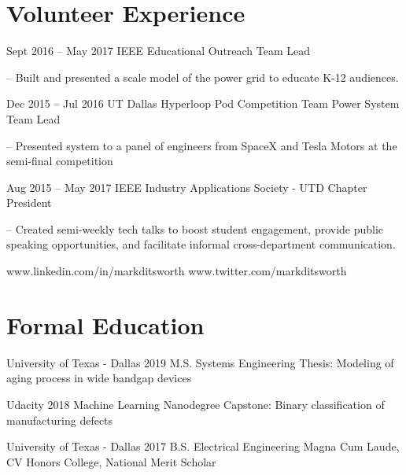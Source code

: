 \documentclass{tccv}
\begin{document}
\section{Volunteer Experience}

\begin{eventlist}
	\item{Sept 2016 -- May 2017}
	{IEEE Educational Outreach}
	{Team Lead}
	
-- Built and presented a scale model of the power grid to educate K-12 audiences. 
	
	\item{Dec 2015 -- Jul 2016}
	{UT Dallas Hyperloop Pod Competition Team}
	{Power System Team Lead}

-- Presented system to a panel of engineers from SpaceX and Tesla Motors at the semi-final competition

	\item{Aug 2015 -- May 2017}
	{IEEE Industry Applications Society - UTD Chapter}
	{President}

-- Created semi-weekly tech talks to boost student engagement, provide public speaking opportunities, and facilitate informal cross-department communication.
\end{eventlist}

    {www.linkedin.com/in/markditsworth}
    {www.twitter.com/markditsworth}

\section{Formal Education}

\begin{yearlist} 

\item[University of Texas - Dallas]{2019}
     {M.S. Systems Engineering}
     {Thesis: Modeling of aging process in wide bandgap devices}

\item[Udacity]{2018}
	 {Machine Learning Nanodegree}
	 {Capstone: Binary classification of manufacturing defects}

\item[University of Texas - Dallas]{2017}
     {B.S. Electrical Engineering}
     {Magna Cum Laude, CV Honors College, National Merit Scholar}

\end{yearlist}
\vspace{-20pt}
\end{document}
